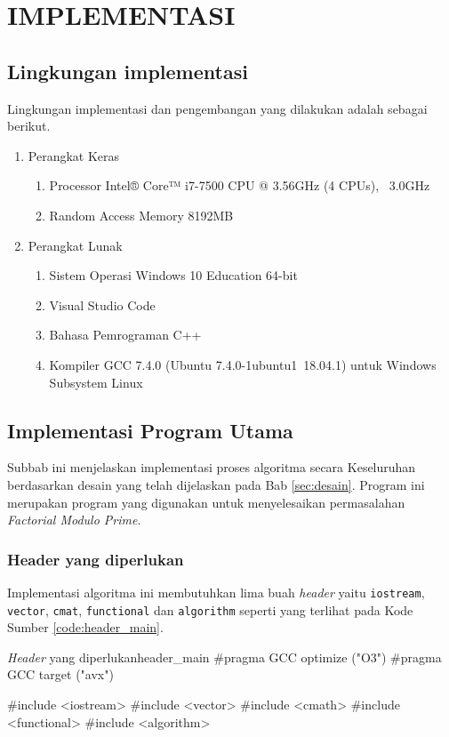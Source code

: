 \chapter {IMPLEMENTASI}

\section{Lingkungan implementasi}

Lingkungan implementasi dan pengembangan yang dilakukan adalah sebagai berikut.
\begin{enumerate}
	\item Perangkat Keras
	\begin{enumerate}
		\item Processor Intel® Core™ i7-7500 CPU @ 3.56GHz (4 CPUs), ~3.0GHz
		\item Random Access Memory 8192MB
	\end{enumerate}
	\item Perangkat Lunak
	\begin{enumerate}
		\item Sistem Operasi Windows 10 Education 64-bit
		\item Visual Studio Code
		\item Bahasa Pemrograman C++
		\item Kompiler GCC 7.4.0 (Ubuntu 7.4.0-1ubuntu1~18.04.1) untuk Windows Subsystem Linux
	\end{enumerate}
\end{enumerate}

\section{Implementasi Program Utama}

Subbab ini menjelaskan implementasi proses algoritma secara Keseluruhan berdasarkan desain yang telah dijelaskan pada Bab \ref{sec:desain}. Program ini merupakan program yang digunakan untuk menyelesaikan permasalahan \textit{Factorial Modulo Prime}.

\subsection{Header yang diperlukan}
Implementasi algoritma ini membutuhkan lima buah \textit{header} yaitu \texttt{iostream}, \texttt{vector}, \texttt{cmat}, \texttt{functional} dan \texttt{algorithm} seperti yang terlihat pada Kode Sumber \ref{code:header_main}.

\begin{code}[firstnumber=1]{\textit{Header} yang diperlukan}{header_main}
#pragma GCC optimize ("O3")
#pragma GCC target ("avx")

#include <iostream>
#include <vector>
#include <cmath>
#include <functional>
#include <algorithm>
\end{code}

